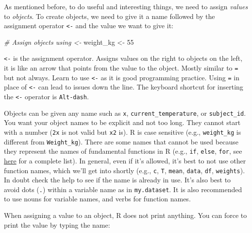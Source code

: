 \documentclass[]{article}
\newenvironment{Shaded}{\begin{snugshade}}{\end{snugshade}}
\newcommand{\DecValTok}[1]{\textcolor[rgb]{0.00,0.00,0.81}{{#1}}}
\newcommand{\StringTok}[1]{\textcolor[rgb]{0.31,0.60,0.02}{{#1}}}
\newcommand{\CommentTok}[1]{\textcolor[rgb]{0.56,0.35,0.01}{\textit{{#1}}}}
\newcommand{\NormalTok}[1]{{#1}}
\begin{document}
As mentioned before, to do useful and interesting things, we need to
assign \emph{values} to \emph{objects}. To create objects, we need to
give it a name followed by the assignment operator \texttt{\textless{}-}
and the value we want to give it:

\begin{Shaded}
\begin{Highlighting}[]
\CommentTok{# Assign objects using <-}
\NormalTok{weight_kg <-}\StringTok{ }\DecValTok{55}
\end{Highlighting}
\end{Shaded}

\texttt{\textless{}-} is the assignment operator. Assigns values on the
right to objects on the left, it is like an arrow that points from the
value to the object. Mostly similar to \texttt{=} but not always. Learn
to use \texttt{\textless{}-} as it is good programming practice. Using
\texttt{=} in place of \texttt{\textless{}-} can lead to issues down the
line. The keyboard shortcut for inserting the \texttt{\textless{}-}
operator is \texttt{Alt-dash}.

Objects can be given any name such as \texttt{x},
\texttt{current\_temperature}, or \texttt{subject\_id}. You want your
object names to be explicit and not too long. They cannot start with a
number (\texttt{2x} is not valid but \texttt{x2} is). R is case
sensitive (e.g., \texttt{weight\_kg} is different from
\texttt{Weight\_kg}). There are some names that cannot be used because
they represent the names of fundamental functions in R (e.g.,
\texttt{if}, \texttt{else}, \texttt{for}, see
\href{https://stat.ethz.ch/R-manual/R-devel/library/base/html/Reserved.html}{here}
for a complete list). In general, even if it's allowed, it's best to not
use other function names, which we'll get into shortly (e.g.,
\texttt{c}, \texttt{T}, \texttt{mean}, \texttt{data}, \texttt{df},
\texttt{weights}). In doubt check the help to see if the name is already
in use. It's also best to avoid dots (\texttt{.}) within a variable name
as in \texttt{my.dataset}. It is also recommended to use nouns for
variable names, and verbs for function names.

When assigning a value to an object, R does not print anything. You can
force to print the value by typing the name:
\end{document}
